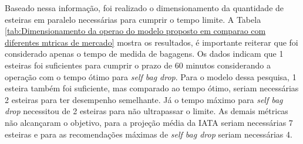     Baseado nessa informação, foi realizado o dimensionamento da quantidade de esteiras em paralelo necessárias para cumprir o tempo limite. A Tabela \ref{tab:Dimensionamento da operao do modelo proposto em comparao com diferentes mtricas de mercado} mostra os resultados, é importante reiterar que foi considerado apenas o tempo de medida de bagagens. Os dados indicam que 1 esteiras foi suficientes para cumprir o prazo de 60 minutos considerando a operação com o tempo ótimo para \textit{self bag drop}. Para o modelo dessa pesquisa, 1 esteira também foi suficiente, mas comparado ao tempo ótimo, seriam necessárias 2 esteiras para ter desempenho semelhante. Já o tempo máximo para \textit{self bag drop} necessitou de 2 esteiras para não ultrapassar o limite. As demais métricas não alcançaram o objetivo, para a projeção média da IATA seriam necessárias 7 esteiras e para as recomendações máximas de \textit{self bag drop} seriam necessárias 4. 

